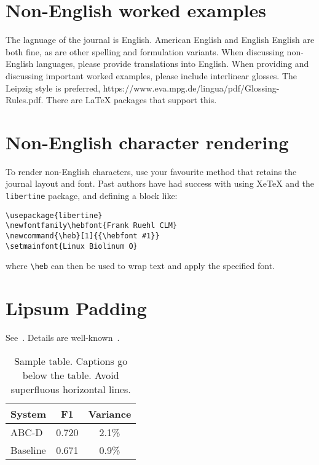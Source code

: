 \documentclass{article}
\begin{document}
\section{Non-English worked examples}

The lagnuage of the journal is English. 
American English and English English are both fine, as are other spelling and formulation variants.
When discussing non-English languages, please provide translations into English.
When providing and discussing important worked examples, please include interlinear glosses.
The Leipzig style is preferred, https://www.eva.mpg.de/lingua/pdf/Glossing-Rules.pdf. There are LaTeX packages that support this.

\section{Non-English character rendering}

To render non-English characters, use your favourite method that retains the journal layout and font. Past authors have had success with using XeTeX and the \texttt{libertine} package, and defining a block like:

\begin{verbatim}
\usepackage{libertine}
\newfontfamily\hebfont{Frank Ruehl CLM}
\newcommand{\heb}[1]{{\hebfont #1}}
\setmainfont{Linux Biolinum O}
\end{verbatim}

where \texttt{{\textbackslash}heb} can then be used to wrap text and apply the specified font.

\section{Lipsum Padding}

See~. \lipsum[4] Details are well-known~\cite{devlin2014fast}.

\begin{table}
    \centering
    \begin{tabular}{lcc}
    \hline
    \textbf{System} & \textbf{F1} & \textbf{Variance} \\
    \hline
        ABC-D &  0.720  & 2.1\% \\
        Baseline & 0.671 & 0.9\% \\
    \hline
    \end{tabular}
    \caption{Sample table. Captions go below the table. Avoid superfluous horizontal lines.}
    \label{tab:demotable}
\end{table}
\end{document}
